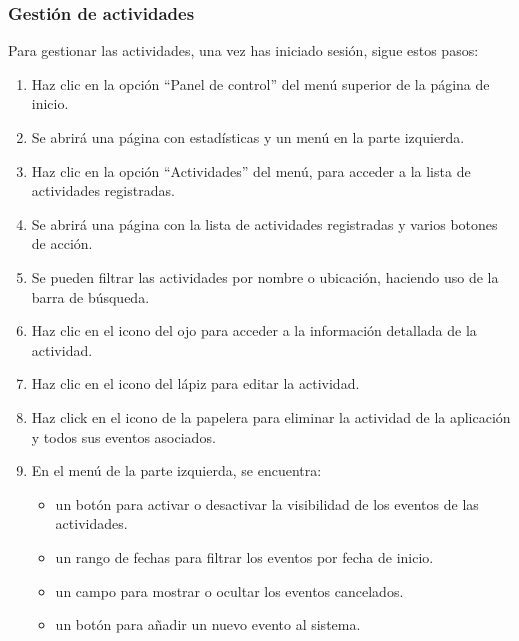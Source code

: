 \subsubsection{Gestión de actividades}
Para gestionar las actividades, una vez has iniciado sesión, sigue estos pasos:
\begin{enumerate}
	\item Haz clic en la opción “Panel de control” del menú superior de la página de inicio.
	\item Se abrirá una página con estadísticas y un menú en la parte izquierda.
	\item Haz clic en la opción “Actividades” del menú, para acceder a la lista de actividades registradas.
	\item Se abrirá una página con la lista de actividades registradas y varios botones de acción.
	\item Se pueden filtrar las actividades por nombre o ubicación, haciendo uso de la barra de búsqueda.
	\item Haz clic en el icono del ojo para acceder a la información detallada de la actividad.
	\item Haz clic en el icono del lápiz para editar la actividad.
	\item Haz click en el icono de la papelera para eliminar la actividad de la aplicación y todos sus eventos asociados.
	\item En el menú de la parte izquierda, se encuentra:
	      \begin{itemize}
		      \item un botón para activar o desactivar la visibilidad de los eventos de las actividades.
		      \item un rango de fechas para filtrar los eventos por fecha de inicio.
		      \item un campo para mostrar o ocultar los eventos cancelados.
		      \item un botón para añadir un nuevo evento al sistema.
	      \end{itemize}
\end{enumerate}

